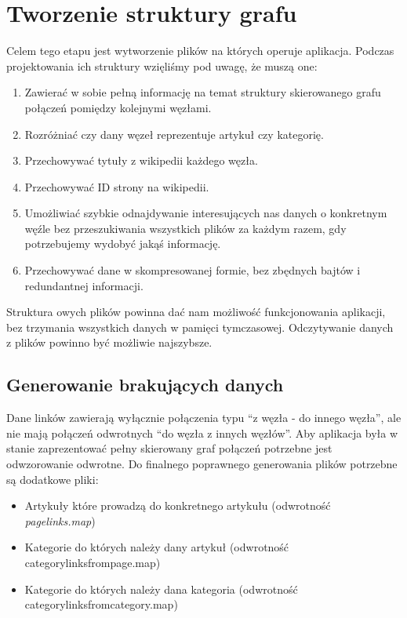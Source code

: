 \section{Tworzenie struktury grafu}
\label{sec:data-files}
Celem tego etapu jest wytworzenie plików na których operuje aplikacja. Podczas projektowania ich struktury wzięliśmy pod uwagę, że muszą one:
\begin{enumerate}
    \item Zawierać w sobie pełną informację na temat struktury skierowanego grafu połączeń pomiędzy kolejnymi węzłami.
    \item Rozróżniać czy dany węzeł reprezentuje artykuł czy kategorię.
    \item Przechowywać tytuły z wikipedii każdego węzła.
    \item Przechowywać ID strony na wikipedii.
    \item Umożliwiać szybkie odnajdywanie interesujących nas danych o konkretnym węźle bez przeszukiwania wszystkich plików za każdym razem, gdy potrzebujemy wydobyć jakąś informację.
    \item Przechowywać dane w skompresowanej formie, bez zbędnych bajtów i redundantnej informacji.
\end{enumerate}

Struktura owych plików powinna dać nam możliwość funkcjonowania aplikacji, bez trzymania wszystkich danych w pamięci tymczasowej. Odczytywanie danych z plików powinno być możliwie najszybsze.

\subsection{Generowanie brakujących danych}

Dane linków zawierają wyłącznie połączenia typu ``z węzła - do innego węzła'', ale nie mają połączeń odwrotnych ``do węzła z innych węzłów''. Aby aplikacja była w stanie zaprezentować pełny skierowany graf połączeń potrzebne jest odwzorowanie odwrotne.
Do finalnego poprawnego generowania plików potrzebne są dodatkowe pliki:
\begin{itemize}
    \item Artykuły które prowadzą do konkretnego artykułu (odwrotność \textit{pagelinks.map})
    \item Kategorie do których należy dany artykuł (odwrotność categorylinksfrompage.map)
    \item Kategorie do których należy dana kategoria (odwrotność categorylinksfromcategory.map)
\end{itemize}

